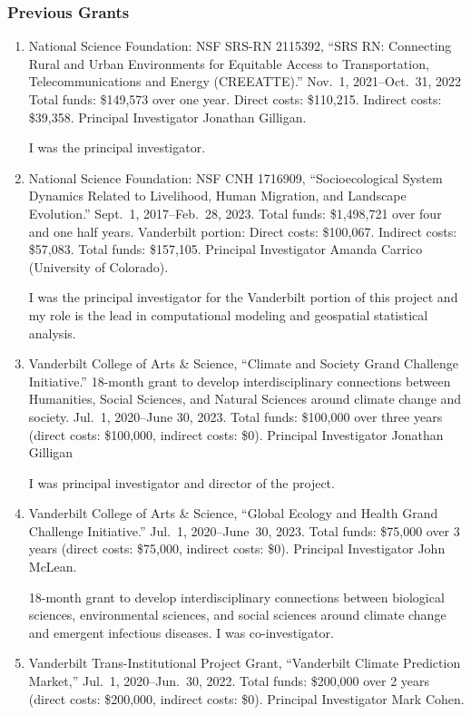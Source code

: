 \subsubsection{Previous Grants}
\begin{enumerate}
%
%
%
\item National Science Foundation: NSF SRS-RN 2115392,
``SRS RN: Connecting Rural and Urban Environments for Equitable Access to
Transportation, Telecommunications and Energy (CREEATTE).''
Nov.~1, 2021--Oct.~31, 2022
Total funds: \$149,573 over one year. Direct costs: \$110,215. Indirect costs: \$39,358.
Principal Investigator Jonathan Gilligan.
\begin{credit}
	I was the principal investigator.
\end{credit}
%
%
\item National Science Foundation: NSF CNH 1716909,
``Socioecological System Dynamics Related to Livelihood, Human Migration, and Landscape Evolution.''
Sept.~1, 2017--Feb.~28, 2023.
Total funds: \$1,498,721 over four and one half years. Vanderbilt portion: Direct costs: \$100,067. Indirect costs: \$57,083. Total funds: \$157,105.
Principal Investigator Amanda Carrico (University of Colorado).
\begin{credit}
	I was the principal investigator for the Vanderbilt portion of this project and my role is the lead in computational modeling and geospatial statistical analysis.
\end{credit}
%
\item Vanderbilt College of Arts \& Science,
``Climate and Society Grand Challenge Initiative.''
18-month grant to develop interdisciplinary connections between Humanities, Social Sciences, and Natural Sciences around climate change and society.
Jul.~1, 2020--June 30, 2023.
Total funds: \$100,000 over three years (direct costs: \$100,000,
indirect costs: \$0).
Principal Investigator Jonathan Gilligan
\begin{credit}
	I was principal investigator and director of the project.
\end{credit}
%
%
\item Vanderbilt College of Arts \& Science,
``Global Ecology and Health Grand Challenge Initiative.''
Jul.~1, 2020--June~30, 2023.
Total funds: \$75,000 over 3 years (direct costs: \$75,000, indirect costs: \$0).
Principal Investigator John McLean.
\begin{credit}
	18-month grant to develop interdisciplinary connections between biological sciences, environmental sciences, and social sciences around climate change and emergent infectious diseases.
	I was co-investigator.
\end{credit}
%
\item Vanderbilt Trans-Institutional Project Grant,
``Vanderbilt Climate Prediction Market,''
Jul.~1, 2020--Jun.~30, 2022.
Total funds: \$200,000 over 2 years (direct costs: \$200,000, indirect costs: \$0).
Principal Investigator Mark Cohen.


\end{enumerate}
